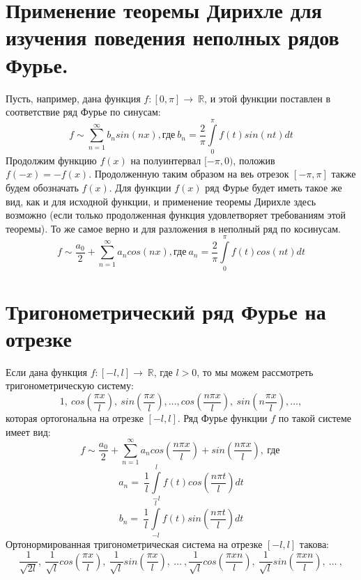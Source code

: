 \documentclass[12pt, a4paper]{article}
\begin{document}
\section{Применение теоремы Дирихле для изучения поведения неполных рядов Фурье.}
Пусть, например, дана функция $f: [0, \pi] \to \ \mathbb{R}$, и этой
функции поставлен в соответствие ряд Фурье по синусам:
$$ 
f \sim \sum\limits_{n=1}^{\infty}b_n sin(nx), \text{где} \ b_n = 
\frac{2}{\pi}\int\limits_{0}^{\pi}f(t)sin(nt)dt
$$
Продолжим функцию $f(x)$ на полуинтервал $[-\pi, 0)$, положив
$f(-x) = -f(x)$. Продолженную таким образом на веь отрезок
$[-\pi, \pi]$ также будем обозначать $f(x)$. Для функции
$f(x)$ ряд Фурье будет иметь такое же вид, как и для
исходной функции, и применение теоремы Дирихле здесь
возможно (если только продолженная функция удовлетворяет требованиям этой теоремы).
То же самое верно и для разложения в неполный ряд по косинусам.
$$ 
f \sim \frac{a_0}{2} + \sum\limits_{n=1}^{\infty}a_n cos(nx), \text{где} \ a_n = 
\frac{2}{\pi}\int\limits_{0}^{\pi}f(t)cos(nt)dt
$$
\section{Тригонометрический ряд Фурье на отрезке}
Если дана функция $f: [-l, l] \to \ \mathbb{R}$, где $l > 0$, то
мы можем рассмотреть тригонометрическую систему:
$$
1, \ cos(\frac{\pi x}{l}), \ sin(\frac{\pi x}{l}), \ldots, 
cos(\frac{n\pi x}{l}), \ sin(n\frac{\pi x}{l}), \ldots ,
$$
которая ортогональна на отрезке $[-l, l]$. Ряд Фурье функции $f$ по такой системе
имеет вид:
$$
f \sim \frac{a_0}{2} + \sum\limits_{n=1}^{\infty}a_n cos(\frac{n \pi x}{l})
+ sin(\frac{n \pi x}{l}) , \ \text{где}\ 
$$
$$
a_n = \ \frac{1}{l}\int\limits_{-l}^{l}f(t)cos(\frac{n\pi t}{l})dt
$$
$$
b_n = \ \frac{1}{l}\int\limits_{-l}^{l}f(t)sin(\frac{n\pi t}{l})dt
$$
Ортонормированная тригонометрическая система на отрезке $[-l, l]$ такова:
$$
\frac{1}{\sqrt{2l}},\ \frac{1}{\sqrt{l}}cos(\frac{\pi x }{l}),\ 
\frac{1}{\sqrt{l}}sin(\frac{\pi x }{l}),\  \ldots \ , \frac{1}{\sqrt{l}}cos(\frac{\pi x n}{l}),\ 
\frac{1}{\sqrt{l}}sin(\frac{\pi x n}{l}), \ \ldots \ ,  
$$
\end{document}
